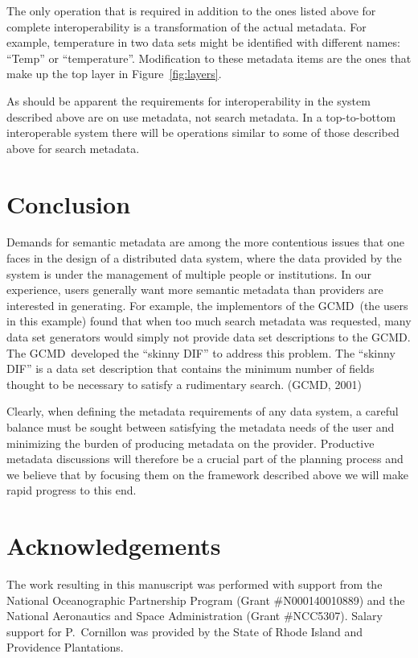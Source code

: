 \documentclass{codata}
\newcommand{\gcmd}{\ac{GCMD}}
\begin{document}
The only operation that is required in addition to the ones listed above
for complete interoperability
is a transformation of the actual metadata. For example, temperature 
in two data sets might be identified with different names: ``Temp'' 
or ``temperature''. Modification to these metadata items are the ones 
that make up the top layer in Figure~\ref{fig:layers}.

As should be apparent the requirements for interoperability in the
system described above are on use metadata, not search metadata. 
In a top-to-bottom interoperable system there will be operations
similar to some of those described above for search metadata.

\section{Conclusion}

Demands for semantic metadata are among the more contentious issues
that one faces in the design of a distributed data system, where the
data provided by the system is under the management of multiple people
or institutions. In our experience, users generally want more semantic
metadata than providers are interested in generating. For example, the
implementors of the \gcmd\ (the users in this example) found that when
too much search metadata was requested, many data set generators would
simply not provide data set descriptions to the \gcmd.  The \gcmd\ 
developed the ``skinny DIF'' to address this problem. The ``skinny
DIF'' is a data set description that contains the minimum number of
fields thought to be necessary to satisfy a rudimentary search.
(GCMD, 2001)

Clearly, when defining the metadata requirements of any data system,
a careful balance must be sought between satisfying the metadata needs
of the user and minimizing the burden of producing metadata on the
provider. Productive metadata discussions will therefore be a crucial
part of the planning process and we believe that by focusing them on
the framework described above we will make rapid progress to this end.

\section{Acknowledgements}

The work resulting in this manuscript was performed with support from the 
National Oceanographic Partnership Program (Grant \#N000140010889) and the 
National Aeronautics and Space Administration (Grant \#NCC5307). Salary 
support for P.~Cornillon was provided by the State of Rhode Island and 
Providence Plantations. 
\end{document}
